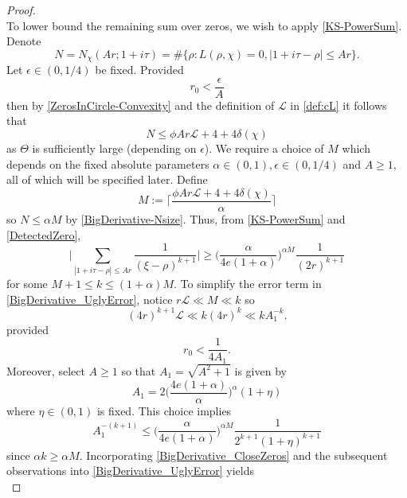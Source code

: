 \documentclass[12pt,psamsfonts]{amsart}
\theoremstyle{definition}
\theoremstyle{remark}
\numberwithin{equation}{section}
\theoremstyle{plain}
\theoremstyle{remark}
\renewcommand{\1}{ {\bf 1}}
\newcommand{\cL}{\mathcal{L}}
\begin{document}
\begin{proof}
\begin{equation}
\end{equation}
To lower bound the remaining sum over zeros, we wish to apply \cref{KS-PowerSum}. Denote
\[
N = N_{\chi}(Ar; 1+i\tau) = \#\{ \rho : L(\rho, \chi) = 0, |1+i\tau - \rho| \leq Ar\}.
\]
Let $\epsilon \in (0,1/4)$ be fixed. Provided
\begin{equation}
r_0 < \frac{\epsilon}{A}
\label{BigDerivative_r0_Cond1}
\end{equation}
then by \cref{ZerosInCircle-Convexity} and the definition of $\cL$ in \eqref{def:cL} it follows that
\begin{equation}
N \leq \phi  Ar \cL + 4 + 4\delta(\chi) 
\label{BigDerivative-Nsize}
\end{equation}
as $\Theta$ is sufficiently large (depending on $\epsilon$). 
We require a choice of $M$ which depends on the fixed absolute parameters $\alpha \in (0,1), \epsilon \in (0,1/4)$ and $A \geq 1$, all of which will be specified later. Define
\begin{equation}
M := \Big\lceil  \frac{ \phi Ar \cL + 4 + 4\delta(\chi) }{\alpha} \Big\rceil 
\label{BigDerivative_M}
\end{equation}
so $N \leq \alpha M$ by \eqref{BigDerivative-Nsize}. Thus, from \cref{KS-PowerSum} and  \eqref{DetectedZero},  
\begin{equation}
\Big| \sum_{|1+i\tau-\rho| \leq Ar} \frac{1}{(\xi-\rho)^{k+1}}  \Big| \geq \Big( \frac{\alpha}{4e(1+\alpha)} \Big)^{\alpha M} \frac{1}{(2r)^{k+1} } 
\label{BigDerivative_CloseZeros}
\end{equation}
for some $M + 1 \leq k \leq (1+\alpha)M$.  To simplify the error term in \eqref{BigDerivative_UglyError}, notice $r\cL \ll M \ll k$ so 
\[
(4r)^{k+1} \cL \ll k (4r)^{k} \ll kA_1^{-k}. 
\]
provided
\begin{equation}
r_0 < \frac{1}{4A_1}.
\label{BigDerivative_r0_Cond2}
\end{equation}
Moreover, select $A \geq 1$ so that $A_1 = \sqrt{A^2+1}$ is given by
\begin{equation}
A_1 = 2 \Big( \frac{4e(1+\alpha)}{\alpha} \Big)^{\alpha}  (1+ \eta)
\label{BigDerivative_A}
\end{equation} 
where $\eta \in (0,1)$ is fixed. This choice implies
\[
A_1^{-(k+1)} \leq \Big( \frac{\alpha}{4e(1+\alpha)} \Big)^{\alpha M}   \frac{1}{2^{k+1}(1+\eta)^{k+1}}
\]
since $\alpha k \geq \alpha M$. Incorporating \eqref{BigDerivative_CloseZeros} and the subsequent observations into \eqref{BigDerivative_UglyError} yields
\begin{equation}

\end{equation}
\end{proof}
\end{document}
